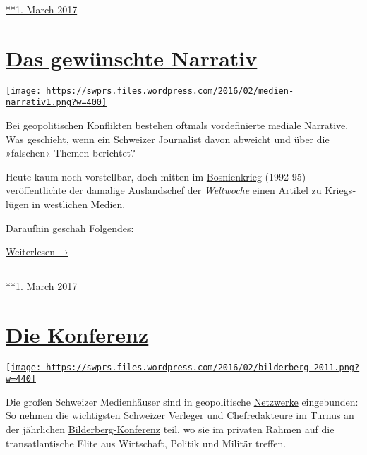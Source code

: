\href{https://swprs.org/2017/03/01/srf-propaganda-analyse/}{**1. March
2017}

\hypertarget{das-gewuxfcnschte-narrativ}{%
\section{\texorpdfstring{\href{https://swprs.org/2017/03/01/das-gewuenschte-narrativ/}{Das
gewünschte
Narrativ}}{Das gewünschte Narrativ}}\label{das-gewuxfcnschte-narrativ}}

\href{https://swprs.org/2017/03/01/das-gewuenschte-narrativ/}{\texttt{[image: https://swprs.files.wordpress.com/2016/02/medien-narrativ1.png?w=400]}}

Bei geopolitischen Konflikten bestehen oftmals vordefinierte mediale
Narrative. Was geschieht, wenn ein Schweizer Jour­na­list davon abweicht
und über die »falschen« Themen be­richtet?

Heute kaum noch vorstellbar, doch mitten im
\href{https://de.wikipedia.org/wiki/Bosnienkrieg}{Bosnien­krieg}
(1992-95) veröffentlichte der damalige Aus­lands­chef der
\emph{Welt­woche} einen Artikel zu Kriegs­lügen in west­lichen Medien.

Daraufhin geschah Folgendes:

\href{https://swprs.org/das-gewuenschte-narrativ\#weiterlesen}{Weiterlesen
→}

\begin{center}\rule{0.5\linewidth}{\linethickness}\end{center}

\href{https://swprs.org/2017/03/01/das-gewuenschte-narrativ/}{**1. March
2017}

\hypertarget{die-konferenz}{%
\section{\texorpdfstring{\href{https://swprs.org/2017/03/01/schweizer-medien-bilderberg-konferenz/}{Die
Konferenz}}{Die Konferenz}}\label{die-konferenz}}

\href{https://swprs.org/2017/03/01/schweizer-medien-bilderberg-konferenz/}{\texttt{[image: https://swprs.files.wordpress.com/2016/02/bilderberg\_2011.png?w=440]}}

Die großen Schweizer Medien­­häuser sind in geo­poli­tische
\href{https://swprs.org/netzwerk-medien-schweiz/}{Netz­werke}
ein­ge­bun­den: So nehmen die wichtigsten Schweizer Verleger und
Chef­redakteure im Turnus an der jähr­lichen
\href{http://www.bilderbergmeetings.org/}{Bilderberg-Konferenz} teil, wo
sie im privaten Rahmen auf die trans­atlan­tische Elite aus
Wirt­schaf‌t, Politik und Militär treffen.


